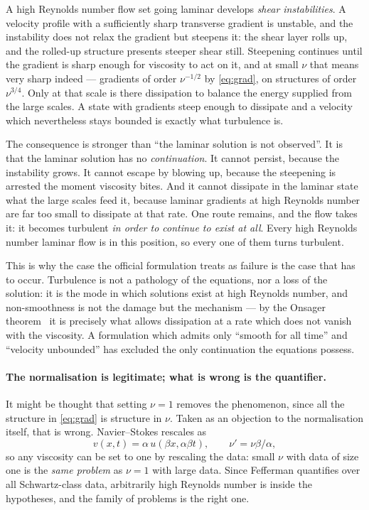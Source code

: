 \documentclass[11pt]{article}
\begin{document}
A high Reynolds number flow set going laminar develops \emph{shear instabilities}. A velocity profile
with a sufficiently sharp transverse gradient is unstable, and the instability does not relax the
gradient but steepens it: the shear layer rolls up, and the rolled-up structure presents steeper shear
still. Steepening continues until the gradient is sharp enough for viscosity to act on it, and at small
$\nu$ that means very sharp indeed --- gradients of order $\nu^{-1/2}$ by \eqref{eq:grad}, on
structures of order $\nu^{3/4}$. Only at that scale is there dissipation to balance the energy supplied
from the large scales. A state with gradients steep enough to dissipate and a velocity which
nevertheless stays bounded is exactly what turbulence is.

The consequence is stronger than ``the laminar solution is not observed''. It is that the laminar
solution has no \emph{continuation}. It cannot persist, because the instability grows. It cannot escape
by blowing up, because the steepening is arrested the moment viscosity bites. And it cannot dissipate
in the laminar state what the large scales feed it, because laminar gradients at high Reynolds number
are far too small to dissipate at that rate. One route remains, and the flow takes it: it becomes
turbulent \emph{in order to continue to exist at all}. Every high Reynolds number laminar flow is in
this position, so every one of them turns turbulent.

This is why the case the official formulation treats as failure is the case that has to occur.
Turbulence is not a pathology of the equations, nor a loss of the solution: it is the mode in which
solutions exist at high Reynolds number, and non-smoothness is not the damage but the mechanism --- by
the Onsager theorem~\cite{onsager,isett} it is precisely what allows dissipation at a rate which does
not vanish with the viscosity. A formulation which admits only ``smooth for all time'' and ``velocity
unbounded'' has excluded the only continuation the equations possess.

\paragraph{The normalisation is legitimate; what is wrong is the quantifier.} It might be thought
that setting $\nu=1$ removes the phenomenon, since all the structure in \eqref{eq:grad} is structure
in $\nu$. Taken as an objection to the normalisation itself, that is wrong. Navier--Stokes rescales
as
\[
v(x,t)=\alpha\,u(\beta x,\alpha\beta t),\qquad \nu'=\nu\beta/\alpha,
\]
so any viscosity can be set to one by rescaling the data: small $\nu$ with data of size one is the
\emph{same problem} as $\nu=1$ with large data. Since Fefferman quantifies over all Schwartz-class
data, arbitrarily high Reynolds number is inside the hypotheses, and the family of problems is the
right one.
\end{document}

